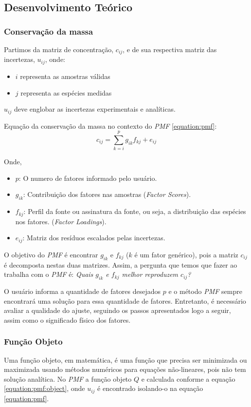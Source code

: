 \subsection{Desenvolvimento Teórico} 

\subsubsection{Conservação da massa}
Partimos da matriz de concentração, $c_{ij}$, e de sua respectiva matriz das incertezas, $u_{ij}$, onde:
\begin{itemize}
  \item $i$ representa as amostras válidas
  \item $j$ representa as espécies medidas
\end{itemize}
$u_{ij}$ deve englobar as incertezas experimentais e analíticas.

Equação da conservação da massa no contexto do \textit{PMF} \ref{equation:pmf}: 
\begin{equation}
  c_{ij} = \sum_{k=i}^p g_{ik}f_{kj} + e_{ij}
  \label{equation:pmf}
\end{equation}

Onde,
\begin{itemize}
  \item $p$: O numero de fatores informado pelo usuário.
  \item $g_{ik}$: Contribuição dos fatores nas amostras (\textit{Factor Scores}).
  \item $f_{kj}$: Perfil da fonte ou assinatura da fonte, ou seja, a distribuição das espécies nos fatores. (\textit{Factor Loadings}).
  \item $e_{ij}$: Matriz dos resíduos escalados pelas incertezas.
\end{itemize}

O objetivo do \textit{PMF} é encontrar $g_{ik}$ e $f_{kj}$ ($k$ é um fator genérico), pois a matriz $c_{ij}$ é decomposta nestas duas matrizes. Assim, a pergunta que temos que fazer ao trabalha com o \textit{PMF} é: 
\textit{Quais $g_{ik}$ e $f_{kj}$ melhor reproduzem $c_{ij}$?}

O usuário informa a quantidade de fatores desejados $p$ e o método \textit{PMF} sempre encontrará uma solução para essa quantidade de fatores. Entretanto, é necessário avaliar a qualidade do ajuste, seguindo os passos apresentados logo a seguir, assim como o significado físico dos fatores. 

\subsubsection{Função Objeto}
Uma função objeto, em matemática, é uma função que precisa ser minimizada ou maximizada usando métodos numéricos para equações não-lineares, pois não tem solução analítica. No \textit{PMF} a função objeto $Q$ e calculada conforme a equação \ref{equation:pmf:object}, onde ${u_{ij}}$ é encontrado isolando-o na equação \ref{equation:pmf}.

